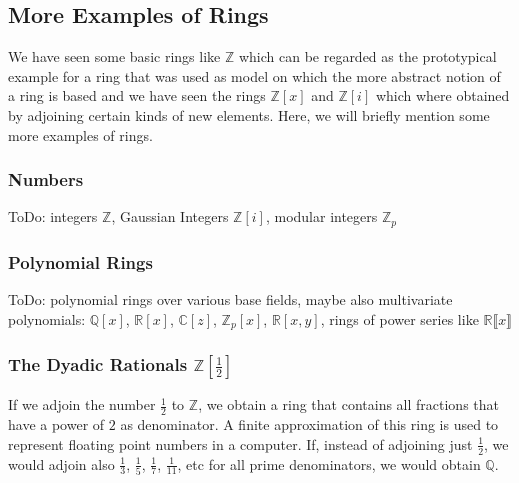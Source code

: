 \subsection{More Examples of Rings}
We have seen some basic rings like $\mathbb{Z}$ which can be regarded as the prototypical example for a ring that was used as model on which the more abstract notion of a ring is based and we have seen the rings $\mathbb{Z}[x]$ and $\mathbb{Z}[i]$ which where obtained by adjoining certain kinds of new elements. Here, we will briefly mention some more examples of rings.

\subsubsection{Numbers}
ToDo: integers $\mathbb{Z}$, Gaussian Integers $\mathbb{Z}[i]$, modular integers $\mathbb{Z}_p$

\subsubsection{Polynomial Rings}
ToDo: polynomial rings over various base fields, maybe also multivariate polynomials: $\mathbb{Q}[x]$, $\mathbb{R}[x]$, $\mathbb{C}[z]$, $\mathbb{Z}_p[x]$, $\mathbb{R}[x,y]$, rings of power series like
$\mathbb{R} \llbracket x \rrbracket$


\subsubsection{The Dyadic Rationals $\mathbb{Z}[\frac{1}{2}]$}
If we adjoin the number $\frac{1}{2}$ to $\mathbb{Z}$, we obtain a ring that contains all fractions that have a power of $2$ as denominator. A finite approximation of this ring is used to represent floating point numbers in a computer. If, instead of adjoining just $\frac{1}{2}$, we would adjoin also $\frac{1}{3}$, $\frac{1}{5}$, $\frac{1}{7}$, $\frac{1}{11}$, etc for all prime denominators, we would obtain $\mathbb{Q}$.

